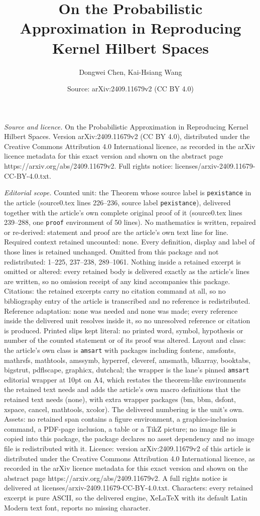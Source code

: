 \documentclass[10pt,a4paper]{amsart}
\title[On the Probabilistic Approximation in Reproducing Kernel Hil]{On the Probabilistic Approximation in Reproducing Kernel Hilbert Spaces}
\author{Dongwei Chen, Kai-Hsiang Wang}
\date{Source: arXiv:2409.11679v2 (CC BY 4.0)}
\begin{document}
\maketitle

\noindent\emph{Source and licence.} On the Probabilistic Approximation in Reproducing Kernel Hilbert Spaces. Version arXiv:2409.11679v2 (CC BY 4.0), distributed under the Creative Commons Attribution 4.0 International licence, as recorded in the arXiv licence metadata for this exact version and shown on the abstract page https://arxiv.org/abs/2409.11679v2. Full rights notice: licenses/arxiv-2409.11679-CC-BY-4.0.txt.\par\smallskip

\noindent\textit{Editorial scope.} Counted unit: the Theorem whose source label is \texttt{pexistance} in the article (source0.tex lines 226--236, source label \texttt{pexistance}), delivered together with the article's own complete original proof of it (source0.tex lines 239--288, one \texttt{proof} environment of 50 lines). No mathematics is written, repaired or re-derived: statement and proof are the article's own text line for line. Required context retained uncounted: none. Every definition, display and label of those lines is retained unchanged. Omitted from this package and not redistributed: 1--225, 237--238, 289--1061. Nothing inside a retained excerpt is omitted or altered: every retained body is delivered exactly as the article's lines are written, so no omission receipt of any kind accompanies this package. Citations: the retained excerpts carry no citation command at all, so no bibliography entry of the article is transcribed and no reference is redistributed. Reference adaptation: none was needed and none was made; every reference inside the delivered unit resolves inside it, so no unresolved reference or citation is produced. Printed slips kept literal: no printed word, symbol, hypothesis or number of the counted statement or of its proof was altered. Layout and class: the article's own class is \texttt{amsart} with packages including fontenc, amsfonts, mathrsfs, mathtools, amssymb, hyperref, cleveref, amsmath, blkarray, booktabs, bigstrut, pdflscape, graphicx, dutchcal; the wrapper is the lane's pinned \texttt{amsart} editorial wrapper at 10pt on A4, which restates the theorem-like environments the retained text needs and adds the article's own macro definitions that the retained text needs (none), with extra wrapper packages (bm, bbm, dsfont, xspace, cancel, mathtools, xcolor). The delivered numbering is the unit's own. Assets: no retained span contains a figure environment, a graphics-inclusion command, a PDF-page inclusion, a table or a TikZ picture; no image file is copied into this package, the package declares no asset dependency and no image file is redistributed with it. Licence: version arXiv:2409.11679v2 of this article is distributed under the Creative Commons Attribution 4.0 International licence, as recorded in the arXiv licence metadata for this exact version and shown on the abstract page https://arxiv.org/abs/2409.11679v2. A full rights notice is delivered at licenses/arxiv-2409.11679-CC-BY-4.0.txt. Characters: every retained excerpt is pure ASCII, so the delivered engine, XeLaTeX with its default Latin Modern text font, reports no missing character.
\end{document}
